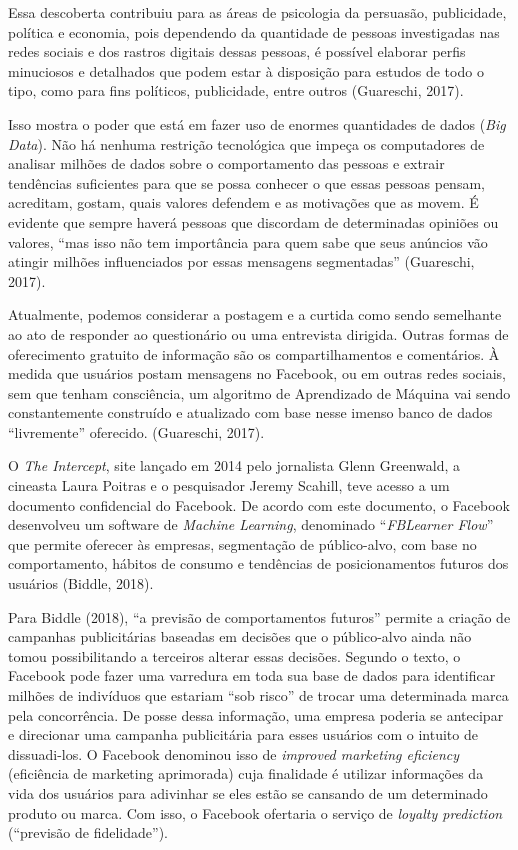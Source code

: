 Essa descoberta contribuiu para as áreas de psicologia da persuasão,
publicidade, política e economia, pois dependendo da quantidade de
pessoas investigadas nas redes sociais e dos rastros digitais dessas
pessoas, é possível elaborar perfis minuciosos e detalhados que podem
estar à disposição para estudos de todo o tipo, como para fins
políticos, publicidade, entre outros (Guareschi, 2017).

Isso mostra o poder que está em fazer uso de enormes quantidades de
dados (\emph{Big Data}). Não há nenhuma restrição tecnológica que impeça
os computadores de analisar milhões de dados sobre o comportamento das
pessoas e extrair tendências suficientes para que se possa conhecer o
que essas pessoas pensam, acreditam, gostam, quais valores defendem e as
motivações que as movem. É evidente que sempre haverá pessoas que
discordam de determinadas opiniões ou valores, ``mas isso não tem
importância para quem sabe que seus anúncios vão atingir milhões
influenciados por essas mensagens segmentadas'' (Guareschi, 2017).

Atualmente, podemos considerar a postagem e a curtida como sendo
semelhante ao ato de responder ao questionário ou uma entrevista
dirigida. Outras formas de oferecimento gratuito de informação são os
compartilhamentos e comentários. À medida que usuários postam mensagens
no Facebook, ou em outras redes sociais, sem que tenham consciência, um
algoritmo de Aprendizado de Máquina vai sendo constantemente construído
e atualizado com base nesse imenso banco de dados ``livremente''
oferecido. (Guareschi, 2017).

O \emph{The Intercept}, site lançado em 2014 pelo jornalista Glenn
Greenwald, a cineasta Laura Poitras e o pesquisador Jeremy Scahill, teve
acesso a um documento confidencial do Facebook. De acordo com este
documento, o Facebook desenvolveu um software de \emph{Machine
Learning}, denominado ``\emph{FBLearner Flow}'' que permite oferecer às
empresas, segmentação de público-alvo, com base no comportamento,
hábitos de consumo e tendências de posicionamentos futuros dos usuários
(Biddle, 2018).

Para Biddle (2018), ``a previsão de comportamentos futuros'' permite a
criação de campanhas publicitárias baseadas em decisões que o
público-alvo ainda não tomou possibilitando a terceiros alterar essas
decisões. Segundo o texto, o Facebook pode fazer uma varredura em toda
sua base de dados para identificar milhões de indivíduos que estariam
``sob risco'' de trocar uma determinada marca pela concorrência. De
posse dessa informação, uma empresa poderia se antecipar e direcionar
uma campanha publicitária para esses usuários com o intuito de
dissuadi-los. O Facebook denominou isso de \emph{improved marketing
eficiency} (eficiência de marketing aprimorada) cuja finalidade é
utilizar informações da vida dos usuários para adivinhar se eles estão
se cansando de um determinado produto ou marca. Com isso, o Facebook
ofertaria o serviço de \emph{loyalty
predictio}\protect\hypertarget{__DdeLink__5091_1336756163}{}{}\emph{n}
(``previsão de fidelidade'').


